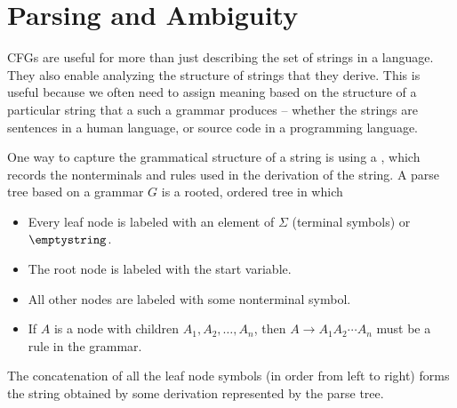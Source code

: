 \documentclass[twoside,letterpaper,openany]{book}
\begin{document}
\clearpage

\section{Parsing and Ambiguity}

\begin{discussion}
CFGs are useful for more than just describing the set of strings in a language. They also enable analyzing the structure of strings that they derive. This is useful because we often need to assign meaning based on the structure of a particular string that a such a grammar produces -- whether the strings are sentences in a human language, or source code in a programming language.
\end{discussion}

\begin{defn}
One way to capture the grammatical structure of a string is using a , which records the nonterminals and rules used in the derivation of the string. A parse tree based on a grammar $G$ is a rooted, ordered tree in which
\begin{itemize}
\item Every leaf node is labeled with an element of $\Sigma$ (terminal symbols) or $\emptystring$.
\item The root node is labeled with the start variable.
\item All other nodes are labeled with some nonterminal symbol.
\item If $A$ is a node with children $A_1, A_2, \ldots, A_n$, then $A \to A_1 A_2 \cdots A_n$ must be a rule in the grammar.
\end{itemize}
The concatenation of all the leaf node symbols (in order from left to right) forms the string obtained by some derivation represented by the parse tree.
\end{defn}
\end{document}
